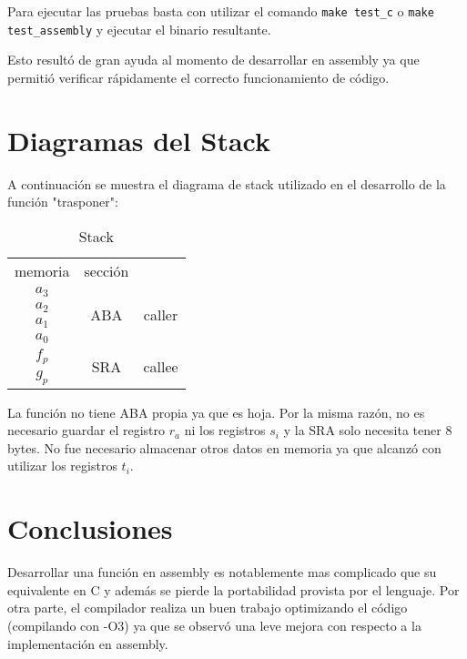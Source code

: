 \documentclass[11pt,a4paper]{article}
\begin{document}
Para ejecutar las pruebas basta con utilizar el comando \texttt{make test\_c} o
\texttt{make test\_assembly} y ejecutar el binario resultante.

Esto resultó de gran ayuda al momento de desarrollar en assembly ya que permitió
verificar rápidamente el correcto funcionamiento de código.

\section{Diagramas del Stack}

A continuaci\'on se muestra el diagrama de stack utilizado en el desarrollo de
la funci\'on "trasponer":

\begin{table}[h!]
  \begin{center}
    \label{tab:table1}
    \begin{tabular}{|c|c|c}
        \cline{1-2}
        memoria & secci\'on & \\
        \cline{1-2}
        \cline{1-2}
        $a_3$ & \multirow{4}{*}{ABA} & \multirow{4}{*}{caller}\\
        \cline{1-1}
        $a_2$ & &\\
        \cline{1-1}
        $a_1$ & &\\
        \cline{1-1}
        $a_0$ & &\\
        \hline
        $f_p$ & \multirow{2}{*}{SRA} & \multirow{2}{*}{callee}\\
        \cline{1-1}
        $g_p$ & &\\
        \cline{1-2}
    \end{tabular}
    \caption{Stack}
  \end{center}
\end{table}

La funci\'on no tiene ABA propia ya que es hoja. Por la misma raz\'on, no
es necesario guardar el registro $r_a$ ni los registros $s_i$ y la SRA solo necesita tener 8 bytes.
No fue necesario almacenar otros datos en memoria ya que alcanzó con utilizar
los registros $t_i$.

\section{Conclusiones}

Desarrollar una funci\'on en assembly es notablemente mas complicado que su equivalente en C y
adem\'as se pierde la portabilidad provista por el lenguaje. Por otra parte, el compilador
realiza un buen trabajo optimizando el c\'odigo (compilando con -O3) ya que se observ\'o una
leve mejora con respecto a la implementaci\'on en assembly.
\end{document}

